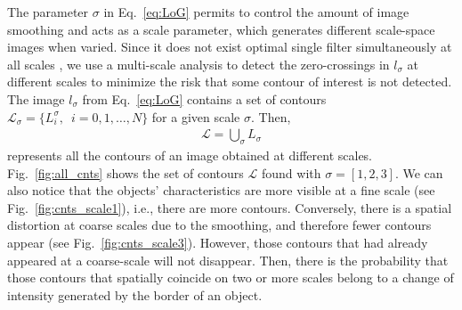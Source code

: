 The parameter $\sigma$ in Eq.\ \eqref{eq:LoG} permits to control the amount of image smoothing and acts as a scale parameter, which generates different scale-space images when varied. Since it does not exist optimal single filter simultaneously at all scales \citep{Marr.Hildreth:PRS:1980}, we use a multi-scale analysis \citep{Witkin:ICASSP:1984} to detect the zero-crossings in $l_\sigma$ at different scales to minimize the risk that some contour of interest is not detected. The image $l_\sigma$ from Eq.\ \eqref{eq:LoG} contains a set of contours $\mathcal{L}_{\sigma}=\{L_{i}^{\sigma}, \enspace i=0, 1, \ldots, N\}$ for a given scale $\sigma$. Then, 
\begin{eqnarray}\label{eq:all_ctns_set}
\mathcal{L}=\bigcup\limits_{\sigma}  L_{\sigma}
\end{eqnarray}
represents all the contours of an image obtained at different scales. Fig.\ \ref{fig:all_cnts} shows the set of contours $\mathcal{L}$ found with $\sigma=[1,2,3]$. We can also notice that the objects' characteristics are more visible at a fine scale (see Fig.\ \ref{fig:cnts_scale1}), i.e., there are more contours. Conversely, there is a spatial distortion at coarse scales due to the smoothing, and therefore fewer contours appear (see Fig.\ \ref{fig:cnts_scale3}). However, those contours that had already appeared at a coarse-scale will not disappear. Then, there is the probability that those contours that spatially coincide on two or more scales belong to a change of intensity generated by the border of an object.

